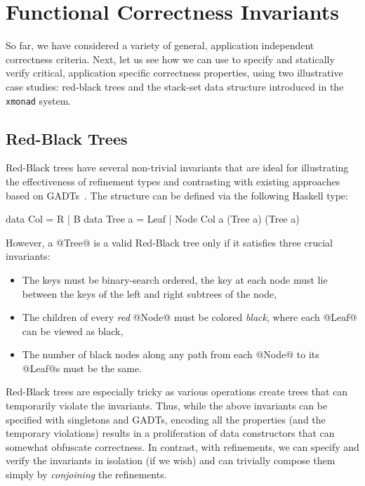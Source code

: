 \newcommand\lbxmonad{\texttt{xmonad}\xspace}

\section{Functional Correctness Invariants}\label{sec:structures}

So far, we have considered a variety of general, application independent
correctness criteria. Next, let us see how we can use \toolname to specify 
and statically verify critical, application specific correctness properties,
using two illustrative case studies: red-black trees and the stack-set data
structure introduced in the \lbxmonad system.

\subsection{Red-Black Trees}\label{sec:redblack}

Red-Black trees have several non-trivial invariants that are ideal for 
illustrating the effectiveness of refinement types and contrasting with
existing approaches based on GADTs~\cite{Kahrs01}.
%
The structure can be defined via the following Haskell type:
%
\begin{code}
  data Col    = R | B
  data Tree a = Leaf 
              | Node Col a (Tree a) (Tree a)
\end{code}
%
However, a @Tree@ is a valid Red-Black tree only if it 
satisfies three crucial invariants:
%
\begin{itemize}
  \item{} 
    The keys must be binary-search ordered, \ie the key at each node must
    lie between the keys of the left and right subtrees of the node,
  \item{}
    The children of every \emph{red} @Node@ must be colored \emph{black}, 
    where each @Leaf@ can be viewed as black,
  \item{}
    The number of black nodes along any path from each @Node@ to its @Leaf@s 
    must be the same.
\end{itemize}

Red-Black trees are especially tricky as various operations create 
trees that can temporarily violate the invariants. Thus, while 
the above invariants can be specified with singletons and GADTs, 
encoding all the properties (and the temporary violations) results
in a proliferation of data constructors that can somewhat obfuscate 
correctness. In contrast, with refinements, we can specify and verify
the invariants in isolation (if we wish) and can trivially compose
them simply by \emph{conjoining} the refinements.

